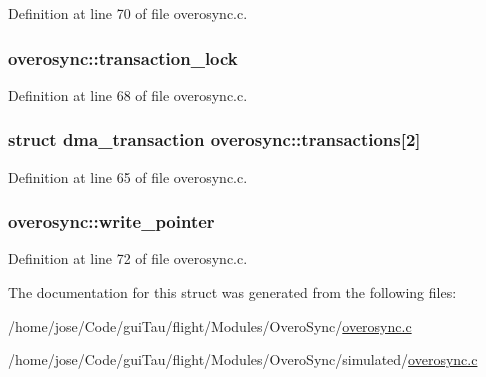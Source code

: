 Definition at line 70 of file overosync.\-c.

\hypertarget{structoverosync_acca01c899cb020526ac2809ba6b27fc0}{
\subsubsection[{transaction\-\_\-lock}]{ overosync\-::transaction\-\_\-lock}}\label{structoverosync_acca01c899cb020526ac2809ba6b27fc0}


Definition at line 68 of file overosync.\-c.

\hypertarget{structoverosync_afb53dc0407f8d5e956d83e78c3b15782}{
\subsubsection[{transactions}]{\setlength{\rightskip}{0pt plus 5cm}struct {\bf dma\-\_\-transaction} overosync\-::transactions\mbox{[}2\mbox{]}}}\label{structoverosync_afb53dc0407f8d5e956d83e78c3b15782}


Definition at line 65 of file overosync.\-c.

\hypertarget{structoverosync_a094836cef0f9cc8e8b45f8d6a58dc9ad}{
\subsubsection[{write\-\_\-pointer}]{ overosync\-::write\-\_\-pointer}}\label{structoverosync_a094836cef0f9cc8e8b45f8d6a58dc9ad}


Definition at line 72 of file overosync.\-c.



The documentation for this struct was generated from the following files\-:\begin{DoxyCompactItemize}
\item 
/home/jose/\-Code/gui\-Tau/flight/\-Modules/\-Overo\-Sync/\hyperlink{overosync_8c}{overosync.\-c}\item 
/home/jose/\-Code/gui\-Tau/flight/\-Modules/\-Overo\-Sync/simulated/\hyperlink{simulated_2overosync_8c}{overosync.\-c}\end{DoxyCompactItemize}
